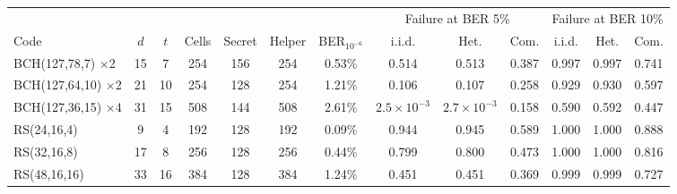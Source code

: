 \begin{tabular}{lcccccccccccc}
\toprule
 & & & & & & & \multicolumn{3}{c}{Failure at BER 5\%} & \multicolumn{3}{c}{Failure at BER 10\%} \\
Code & $d$ & $t$ & Cells & Secret & Helper & BER$_{10^{-6}}$ & i.i.d. & Het. & Com. & i.i.d. & Het. & Com. \\
\midrule
BCH(127,78,7) $\times$2 & 15 & 7 & 254 & 156 & 254 & 0.53\% & 0.514 & 0.513 & 0.387 & 0.997 & 0.997 & 0.741 \\
BCH(127,64,10) $\times$2 & 21 & 10 & 254 & 128 & 254 & 1.21\% & 0.106 & 0.107 & 0.258 & 0.929 & 0.930 & 0.597 \\
BCH(127,36,15) $\times$4 & 31 & 15 & 508 & 144 & 508 & 2.61\% & $2.5\times10^{-3}$ & $2.7\times10^{-3}$ & 0.158 & 0.590 & 0.592 & 0.447 \\
RS(24,16,4) & 9 & 4 & 192 & 128 & 192 & 0.09\% & 0.944 & 0.945 & 0.589 & 1.000 & 1.000 & 0.888 \\
RS(32,16,8) & 17 & 8 & 256 & 128 & 256 & 0.44\% & 0.799 & 0.800 & 0.473 & 1.000 & 1.000 & 0.816 \\
RS(48,16,16) & 33 & 16 & 384 & 128 & 384 & 1.24\% & 0.451 & 0.451 & 0.369 & 0.999 & 0.999 & 0.727 \\
\bottomrule
\end{tabular}
